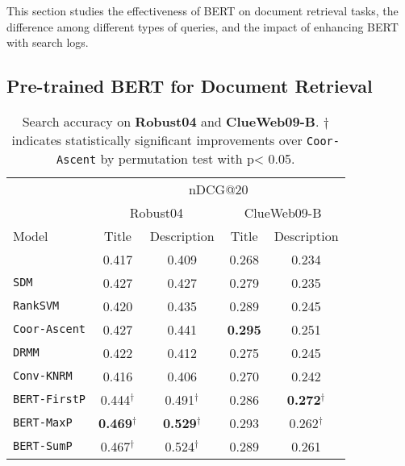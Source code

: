 \documentclass[sigconf]{acmart}
\begin{document}
This section studies the effectiveness of BERT on document retrieval tasks, the difference among different types of queries, and the impact of enhancing BERT with search logs.

\subsection{Pre-trained BERT for Document Retrieval}



\begin{table}[t]
\caption{Search accuracy on \textbf{Robust04} and \textbf{ClueWeb09-B}. $\dagger$ indicates statistically significant improvements over \texttt{Coor-Ascent} by permutation test with p< 0.05.}\label{tab:overall}

\def\arraystretch{0.9}
\vspace{-0.15in}
\begin{tabular}{l|cc||cc}
\hline \hline
  &  \multicolumn{4}{c}{nDCG@20}\\
\multirow{3}{*}{Model} & \multicolumn{2}{c||}{Robust04} & \multicolumn{2}{c}{ClueWeb09-B} \\
 & \multicolumn{1}{c}{Title  } & \multicolumn{1}{c||}{Description  } & \multicolumn{1}{c}{Title  } & \multicolumn{1}{c}{Description }  \\
                            \hline
\texttt{BOW}                         & 0.417    & 0.409   
 & 0.268  & 0.234  \\
\texttt{SDM}                         & 0.427           & 0.427         & 0.279 & 0.235  \\ \hline
\texttt{RankSVM}                    & 0.420         &   0.435        & 0.289  & 0.245  \\
\texttt{Coor-Ascent}                & 0.427            &     0.441               & \textbf{0.295}  & 0.251  \\ \hline
\texttt{DRMM}                       & 0.422          & 0.412            & 0.275  & 0.245  \\ 
\texttt{Conv-KNRM}                       &  0.416        &  0.406          & 0.270  &  0.242 \\ \hline\hline
\texttt{BERT-FirstP}           & 0.444$^\dagger$            & 0.491$^\dagger$             & 0.286  & \textbf{0.272}$^\dagger$    \\
\texttt{BERT-MaxP}            & \textbf{0.469}$^\dagger$           & \textbf{0.529}$^\dagger$          & 0.293  & 0.262$^\dagger$   \\ 
\texttt{BERT-SumP}        &  0.467$^\dagger$     &   0.524$^\dagger$    &   0.289 &   0.261      \\ 
\hline \hline 
 

\end{tabular}
\end{table}
\end{document}
